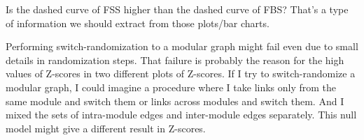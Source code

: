 {	Is the dashed curve of FSS higher than the dashed curve of FBS? That's a type of information we should extract from those plots/bar charts.
	
	Performing switch-randomization to a modular graph might fail even due to small details in randomization steps. That failure is probably the reason for the high values of Z-scores in two different plots of Z-scores. If I try to switch-randomize a modular graph, I could imagine a procedure where I take links only from the same module and switch them or links across modules and switch them. And I mixed the sets of intra-module edges and inter-module edges separately. This null model might give a different result in Z-scores.}
\clearpage